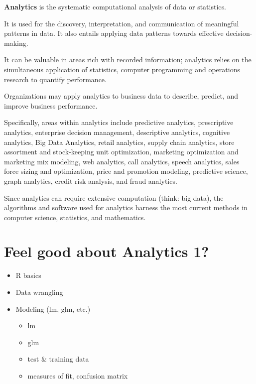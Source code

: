 \documentclass[
]{book}
\providecommand{\tightlist}{%
  \setlength{\itemsep}{0pt}\setlength{\parskip}{0pt}}
\theoremstyle{definition}
\theoremstyle{definition}
\theoremstyle{definition}
\theoremstyle{definition}
\theoremstyle{remark}
\begin{document}
\textbf{Analytics} is the systematic computational analysis of data or statistics.

It is used for the discovery, interpretation, and communication of meaningful patterns in data. It also entails applying data patterns towards effective decision-making.

It can be valuable in areas rich with recorded information; analytics relies on the simultaneous application of statistics, computer programming and operations research to quantify performance.

Organizations may apply analytics to business data to describe, predict, and improve business performance.

Specifically, areas within analytics include predictive analytics, prescriptive analytics, enterprise decision management, descriptive analytics, cognitive analytics, Big Data Analytics, retail analytics, supply chain analytics, store assortment and stock-keeping unit optimization, marketing optimization and marketing mix modeling, web analytics, call analytics, speech analytics, sales force sizing and optimization, price and promotion modeling, predictive science, graph analytics, credit risk analysis, and fraud analytics.

Since analytics can require extensive computation (think: big data), the algorithms and software used for analytics harness the most current methods in computer science, statistics, and mathematics.

\hypertarget{feel-good-about-analytics-1}{%
\section{Feel good about Analytics 1?}\label{feel-good-about-analytics-1}}

\begin{itemize}
\tightlist
\item
  R basics
\item
  Data wrangling
\item
  Modeling (lm, glm, etc.)

  \begin{itemize}
  \tightlist
  \item
    lm
  \item
    glm
  \item
    test \& training data
  \item
    measures of fit, confusion matrix
  \end{itemize}
\end{itemize}
\end{document}
